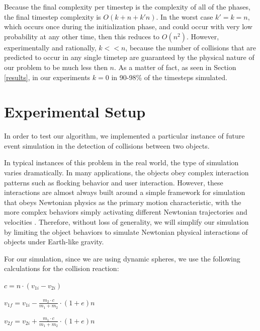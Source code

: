 \documentclass[conference]{IEEEtran}
\begin{document}
Because the final complexity per timestep is the complexity of all of the phases, the final timestep complexity is $O(k+n+k'n)$.  In the worst case $k'=k=n$, which occurs once during the initialization phase, and could occur with 
very low probability at any other time, then this reduces to $O(n^2)$.  However, experimentally and rationally, $k << n$, because the number of collisions
that are predicted to occur in any single timetep are guaranteed by the physical nature of our problem to be much less then $n$.  As a matter of fact, as seen in Section \ref{results}, in our experiments
$k=0$ in 90-98\% of the timesteps simulated.

\section{Experimental Setup}%

In order to test our algorithm, we implemented a particular instance of future event simulation in the detection of collisions between two objects.

In typical instances of this problem in the real world, the type of simulation varies dramatically. In many applications, the objects obey complex interaction patterns such as flocking behavior and user interaction.  However, these interactions are almost always built around a simple framework for simulation that obeys Newtonian physics as the primary motion characteristic, with the more complex
behaviors simply activating different Newtonian trajectories and velocities \cite{Jadbabaie02coordinationof}.  Therefore, without loss of generality, we will simplify our simulation by limiting the object behaviors to simulate Newtonian physical interactions of objects under Earth-like gravity.

For our simulation, since we are using dynamic spheres, we use the following calculations for the collision reaction\cite{wheatchex}:

\begin{math}
c = n \cdot (v_{1i} - v_{2i})
\end{math}

\begin{math}
v_{1f} = v_{1i} - \frac{m_2 \cdot c}{m_1 + m_2} \cdot (1 + e)n
\end{math}

\begin{math}
v_{2f} = v_{2i} + \frac{m_1 \cdot c}{m_1 + m_2} \cdot (1 + e)n
\end{math}
\end{document}
